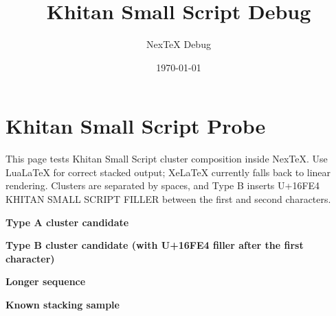 \documentclass[12pt]{nextart}
\title{Khitan Small Script Debug}
\author{NexTeX Debug}
\date{\today}
\begin{document}
\maketitle

\section*{Khitan Small Script Probe}

This page tests Khitan Small Script cluster composition inside NexTeX.
Use LuaLaTeX for correct stacked output; XeLaTeX currently falls back to linear rendering.
Clusters are separated by spaces, and Type B inserts U+16FE4 KHITAN SMALL SCRIPT FILLER between
the first and second characters.

\bigskip

\textbf{Type A cluster candidate}

\medskip


\bigskip

\textbf{Type B cluster candidate (with U+16FE4 filler after the first character)}

\medskip


\bigskip

\textbf{Longer sequence}

\medskip


\bigskip

\textbf{Known stacking sample}

\medskip

\end{document}
